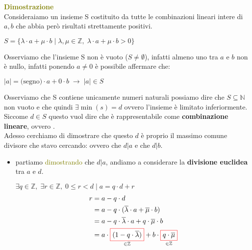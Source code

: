 \begin{boxA}
    \textcolor{olive}{\textbf{Dimostrazione}} \\
    Consideraiamo un insieme S costituito da tutte le combinazioni lineari intere di $a, b$ che abbia però risultati strettamente positivi.
    
    {\centering
        $S = \{\lambda \cdot a + \mu \cdot b \; \vert \; \lambda, \mu \in \mathbb{Z}, \; \lambda \cdot a + \mu \cdot b > 0\}$
    \par}

    Osserviamo che l'insieme S non è vuoto ($S \neq \emptyset$), infatti almeno uno tra $a$ e $b$ non è nullo, infatti ponendo $a \neq 0$ è possibile affermare che:

    {\centering
        $| a | = \text{(segno)} \cdot a + 0 \cdot b \; \rightarrow \; | a | \in S$
    \par}

    Osserviamo che S contiene unicamente numeri naturali possiamo dire che $S \subseteq \mathbb{N}$ non vuoto e che quindi $\exists \min(s) = d$ ovvero l'insieme è limitato inferiormente. Siccome $d \in S$ questo vuol dire che è rappresentabile come \textbf{combinazione lineare}, ovvero . \\
    Adesso cerchiamo di dimostrare che questo $d$ è proprio il massimo comune divisore che stavo cercando:  ovvero che $d|a$ e che $d|b$.
    \begin{itemize}[nosep]
        \item partiamo \textcolor{olive}{dimostrando} che $d|a$, andiamo a considerare la \textbf{divisione euclidea} tra $a$ e $d$.

        {\centering
            $\exists q \in \mathbb{Z}, \; \exists r \in \mathbb{Z}, \; 0 \leq r < d \; \vert \; a = q \cdot d + r$
            \begin{align*}
            r &= a - q \cdot d \\
            &= a - q \cdot (\overline{\lambda} \cdot a + \overline{\mu} \cdot b) \\
            &= a - q \cdot \overline{\lambda} \cdot a + q \cdot \overline{\mu} \cdot b \\
            &= a \cdot \underset{\in \mathbb{Z}}{\fcolorbox{red}{white}{$(1 - q \cdot \overline{\lambda})$}} + b \cdot \underset{\in \mathbb{Z}}{\fcolorbox{red}{white}{$q \cdot \overline{\mu}$}}
            \end{align*}
        \par}


\end{itemize}
\end{boxA}
